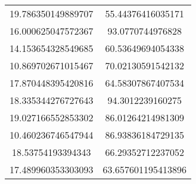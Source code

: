 \begin{table}
\begin{tabular}{cc}
19.786350149889707 & 55.44376416035171 \\
16.000625047572367 & 93.0770744976828 \\
14.153654328549685 & 60.53649694054338 \\
10.869702671015467 & 70.02130591542132 \\
17.870448395420816 & 64.58307867407534 \\
18.335344276727643 & 94.3012239160275 \\
19.027166552853302 & 86.01264214981309 \\
10.460236746547944 & 86.93836184729135 \\
18.53754193394343 & 66.29352712237052 \\
17.489960353303093 & 63.657601195413896 \\
\end{tabular}
\end{table}
